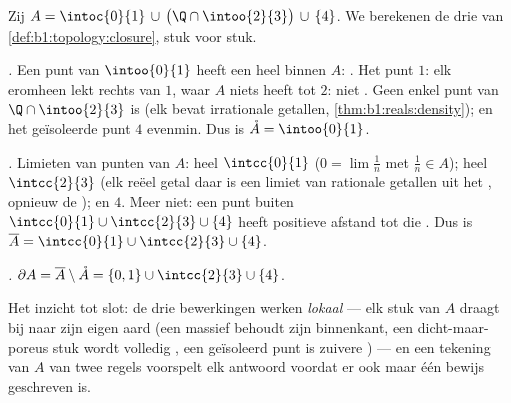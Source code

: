 \begin{example}\label{ex:b1:topology:anatomy}
Zij $A = \intoc{0}{1} \,\cup\, \bigl(\Q \cap \intoo{2}{3}\bigr) \,\cup\,
\{4\}$. We berekenen de drie  van
\cref{def:b1:topology:closure}, stuk voor stuk.

\emph{.} Een punt van $\intoo{0}{1}$ heeft een heel 
binnen $A$: . Het punt $1$: elk  eromheen lekt rechts van
$1$, waar $A$ niets heeft tot $2$: niet . Geen enkel punt van $\Q
\cap \intoo{2}{3}$ is  (elk  bevat irrationale getallen,
\cref{thm:b1:reals:density}); en het geïsoleerde punt $4$ evenmin. Dus is
$\mathring A = \intoo{0}{1}$.

\emph{.} Limieten van punten van $A$: heel $\intcc{0}{1}$ ($0 =
\lim \frac1n$ met $\frac 1n \in A$); heel $\intcc{2}{3}$ (elk reëel getal
daar is een limiet van rationale getallen uit het , opnieuw de
); en $4$. Meer niet: een punt buiten $\intcc{0}{1} \cup
\intcc{2}{3} \cup \{4\}$ heeft positieve afstand tot die . Dus is $\overline A = \intcc{0}{1} \cup \intcc{2}{3} \cup
\{4\}$.

\emph{.} $\partial A = \overline A \setminus \mathring A = \{0, 1\}
\cup \intcc{2}{3} \cup \{4\}$.

Het inzicht tot slot: de drie bewerkingen werken \emph{lokaal} --- elk
stuk van $A$ draagt bij naar zijn eigen aard (een massief 
behoudt zijn binnenkant, een dicht-maar-poreus stuk wordt volledig ,
een geïsoleerd punt is zuivere ) --- en een tekening van $A$ van twee
regels voorspelt elk antwoord voordat er ook maar één bewijs geschreven
is.
\end{example}

